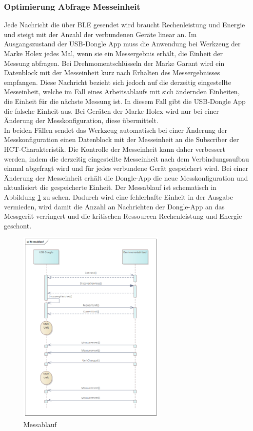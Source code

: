 \subsubsection{Optimierung Abfrage Messeinheit}
\label{OptimierungAbfrage}
Jede Nachricht die über \ac{BLE} gesendet wird braucht Rechenleistung und Energie und steigt mit der Anzahl der verbundenen Geräte linear an. Im Ausgangszustand der \ac{USB}-Dongle App muss die Anwendung bei Werkzeug der Marke Holex jedes Mal, wenn sie ein Messergebnis erhält, die Einheit der Messung abfragen. Bei Drehmomentschlüsseln der Marke Garant wird ein Datenblock mit der Messeinheit kurz nach Erhalten des Messergebnisses empfangen. Diese Nachricht bezieht sich jedoch auf die derzeitig eingestellte Messeinheit, welche im Fall eines Arbeitsablaufs mit sich ändernden Einheiten, die Einheit für die nächste Messung ist. In diesem Fall gibt die \ac{USB}-Dongle App die falsche Einheit aus. Bei Geräten der Marke Holex wird nur bei einer Änderung der Messkonfiguration, diese übermittelt.\\
In beiden Fällen sendet das Werkzeug automatisch bei einer Änderung der Messkonfiguration einen Datenblock mit der Messeinheit an die Subscriber der \ac{HCT}-Charakteristik. Die Kontrolle der Messeinheit kann daher verbessert werden, indem die derzeitig eingestellte Messeinheit nach dem Verbindungsaufbau einmal abgefragt wird und für jedes verbundene Gerät gespeichert wird. Bei einer Änderung der Messeinheit erhält die Dongle-App die neue Messkonfiguration und aktualisiert die gespeicherte Einheit. Der Messablauf ist schematisch in Abbildung \ref{fig:Messablauf} zu sehen. Dadurch wird eine fehlerhafte Einheit in der Ausgabe vermieden, wird damit die Anzahl an Nachrichten der Dongle-App an das Messgerät verringert und die kritischen Ressourcen Rechenleistung und Energie geschont.

\begin{figure}[H] 
	\centering
	\includegraphics[width=0.65\textwidth]{figures/Messablauf.png}
	\caption{Messablauf}
	\label{fig:Messablauf}
\end{figure}